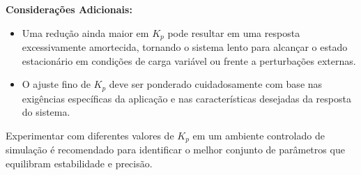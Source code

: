 \textbf{Considerações Adicionais:}
\begin{itemize}
    \item Uma redução ainda maior em \(K_p\) pode resultar em uma resposta excessivamente amortecida, tornando o sistema lento para alcançar o estado estacionário em condições de carga variável ou frente a perturbações externas.
    \item O ajuste fino de \(K_p\) deve ser ponderado cuidadosamente com base nas exigências específicas da aplicação e nas características desejadas da resposta do sistema.
\end{itemize}

Experimentar com diferentes valores de \(K_p\) em um ambiente controlado de simulação é recomendado para identificar o melhor conjunto de parâmetros que equilibram estabilidade e precisão.
